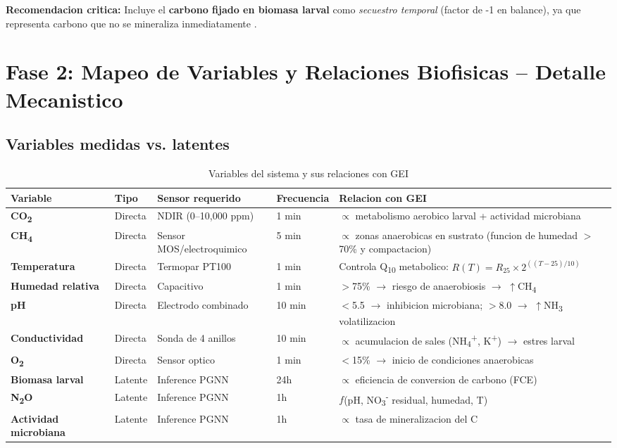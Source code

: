 \documentclass[12pt]{article}
\begin{document}
\noindent\textbf{Recomendacion critica:} Incluye el \textbf{carbono fijado en biomasa larval} como \textit{secuestro temporal} (factor de -1 en balance), ya que representa carbono que no se mineraliza inmediatamente \cite{ref56}.

\newpage

\section{Fase 2: Mapeo de Variables y Relaciones Biofisicas -- Detalle Mecanistico}

\subsection{Variables medidas vs. latentes}

\begin{table}[H]
\centering
\caption{Variables del sistema y sus relaciones con GEI}
\label{tab:variables_gei}
\begin{tabular}{|l|l|l|l|l|}
\hline
\textbf{Variable} & \textbf{Tipo} & \textbf{Sensor requerido} & \textbf{Frecuencia} & \textbf{Relacion con GEI} \\ \hline
\textbf{CO\textsubscript{2}} & Directa & NDIR (0--10,000 ppm) & 1 min & $\propto$ metabolismo aerobico larval + actividad microbiana \\ \hline
\textbf{CH\textsubscript{4}} & Directa & Sensor MOS/electroquimico & 5 min & $\propto$ zonas anaerobicas en sustrato (funcion de humedad $>$70\% y compactacion) \\ \hline
\textbf{Temperatura} & Directa & Termopar PT100 & 1 min & Controla Q\textsubscript{10} metabolico: $R(T) = R_{25} \times 2^{((T-25)/10)}$ \\ \hline
\textbf{Humedad relativa} & Directa & Capacitivo & 1 min & $>$75\% $\rightarrow$ riesgo de anaerobiosis $\rightarrow$ $\uparrow$CH\textsubscript{4} \\ \hline
\textbf{pH} & Directa & Electrodo combinado & 10 min & $<$5.5 $\rightarrow$ inhibicion microbiana; $>$8.0 $\rightarrow$ $\uparrow$NH\textsubscript{3} volatilizacion \\ \hline
\textbf{Conductividad} & Directa & Sonda de 4 anillos & 10 min & $\propto$ acumulacion de sales (NH\textsubscript{4}\textsuperscript{+}, K\textsuperscript{+}) $\rightarrow$ estres larval \\ \hline
\textbf{O\textsubscript{2}} & Directa & Sensor optico & 1 min & $<$15\% $\rightarrow$ inicio de condiciones anaerobicas \\ \hline
\textbf{Biomasa larval} & Latente & Inference PGNN & 24h & $\propto$ eficiencia de conversion de carbono (FCE) \\ \hline
\textbf{N\textsubscript{2}O} & Latente & Inference PGNN & 1h & $f$(pH, NO\textsubscript{3}\textsuperscript{-} residual, humedad, T) \\ \hline
\textbf{Actividad microbiana} & Latente & Inference PGNN & 1h & $\propto$ tasa de mineralizacion del C \\ \hline
\end{tabular}
\end{table}
\end{document}
